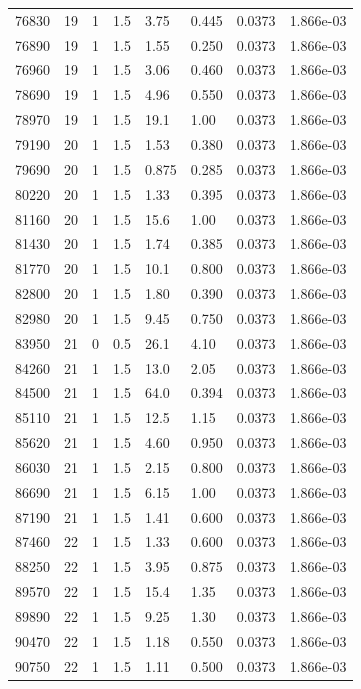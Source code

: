 \documentclass[preview]{standalone}
\begin{document}
{{{{{{{\begin{tabular}{L{1.2cm}C{1.2cm} C{0.3cm}C{0.5cm} C{1.4cm}C{1.4cm} C{1.4cm}C{1.4cm}}
  76830  &    19  & 1     & 1.5 &  3.75  & 0.445  & 0.0373 &  1.866e-03   \\ 
  76890  &    19  & 1     & 1.5 &  1.55  & 0.250  & 0.0373 &  1.866e-03   \\ 
  76960  &    19  & 1     & 1.5 &  3.06  & 0.460  & 0.0373 &  1.866e-03   \\ 
  78690  &    19  & 1     & 1.5 &  4.96  & 0.550  & 0.0373 &  1.866e-03   \\ 
  78970  &    19  & 1     & 1.5 &  19.1  & 1.00  & 0.0373 &  1.866e-03   \\ 
  79190  &    20  & 1     & 1.5 &  1.53  & 0.380  & 0.0373 &  1.866e-03   \\ 
  79690  &    20  & 1     & 1.5 &  0.875  & 0.285  & 0.0373 &  1.866e-03   \\ 
  80220  &    20  & 1     & 1.5 &  1.33  & 0.395  & 0.0373 &  1.866e-03   \\ 
  81160  &    20  & 1     & 1.5 &  15.6  & 1.00  & 0.0373 &  1.866e-03   \\ 
  81430  &    20  & 1     & 1.5 &  1.74  & 0.385  & 0.0373 &  1.866e-03   \\ 
  81770  &    20  & 1     & 1.5 &  10.1  & 0.800  & 0.0373 &  1.866e-03   \\ 
  82800  &    20  & 1     & 1.5 &  1.80  & 0.390  & 0.0373 &  1.866e-03   \\ 
  82980  &    20  & 1     & 1.5 &  9.45  & 0.750  & 0.0373 &  1.866e-03   \\ 
  83950  &    21  & 0     & 0.5 &  26.1  & 4.10  & 0.0373 &  1.866e-03   \\ 
  84260  &    21  & 1     & 1.5 &  13.0  & 2.05  & 0.0373 &  1.866e-03   \\ 
  84500  &    21  & 1     & 1.5 &  64.0  & 0.394  & 0.0373 &  1.866e-03   \\ 
  85110  &    21  & 1     & 1.5 &  12.5  & 1.15  & 0.0373 &  1.866e-03   \\ 
  85620  &    21  & 1     & 1.5 &  4.60  & 0.950  & 0.0373 &  1.866e-03   \\ 
  86030  &    21  & 1     & 1.5 &  2.15  & 0.800  & 0.0373 &  1.866e-03   \\ 
  86690  &    21  & 1     & 1.5 &  6.15  & 1.00  & 0.0373 &  1.866e-03   \\ 
  87190  &    21  & 1     & 1.5 &  1.41  & 0.600  & 0.0373 &  1.866e-03   \\ 
  87460  &    22  & 1     & 1.5 &  1.33  & 0.600  & 0.0373 &  1.866e-03   \\ 
  88250  &    22  & 1     & 1.5 &  3.95  & 0.875  & 0.0373 &  1.866e-03   \\ 
  89570  &    22  & 1     & 1.5 &  15.4  & 1.35  & 0.0373 &  1.866e-03   \\ 
  89890  &    22  & 1     & 1.5 &  9.25  & 1.30  & 0.0373 &  1.866e-03   \\ 
  90470  &    22  & 1     & 1.5 &  1.18  & 0.550  & 0.0373 &  1.866e-03   \\ 
  90750  &    22  & 1     & 1.5 &  1.11  & 0.500  & 0.0373 &  1.866e-03   \\ 
\hline 
\end{tabular} 

}}}}}}}
\end{document}
